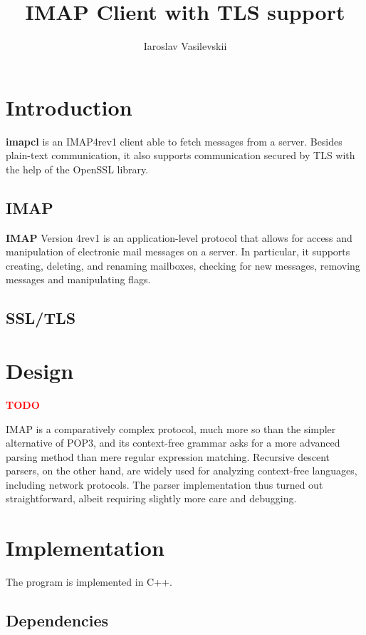 \documentclass[a4]{report}
\title{IMAP Client with TLS support}
\author{Iaroslav Vasilevskii}
\newcommand{\TODO}{
    \textbf{\textcolor{red}{TODO}}
}
\begin{document}
\maketitle
\tableofcontents

\chapter{Introduction}

\textbf{imapcl} is an IMAP4rev1\cite{rfc3501} client able to fetch messages from a server. Besides plain-text communication, it also supports communication secured by TLS with the help of the OpenSSL library.

\section{IMAP}

\textbf{IMAP} Version 4rev1 is an application-level protocol that allows for access and manipulation of electronic mail messages on a server. In particular, it supports creating, deleting, and renaming mailboxes, checking for new messages, removing messages and manipulating flags.

\section{SSL/TLS}

\chapter{Design}


\TODO

IMAP is a comparatively complex protocol, much more so than the simpler alternative of POP3, and its context-free grammar asks for a more advanced parsing method than mere regular expression matching. Recursive descent parsers, on the other hand, are widely used for analyzing context-free languages, including network protocols. The parser implementation thus turned out straightforward, albeit requiring slightly more care and debugging.

\chapter{Implementation}

The program is implemented in C++.

\section{Dependencies}
\end{document}
